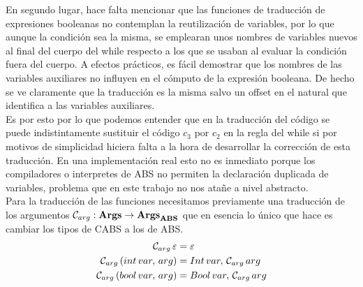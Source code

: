 En segundo lugar, hace falta mencionar que las funciones de traducción de expresiones booleanas no contemplan la reutilización de variables, por lo que aunque la condición sea la misma, se emplearan unos nombres de variables nuevos al final del cuerpo del while respecto a los que se usaban al evaluar la condición fuera del cuerpo. A efectos prácticos, es fácil demostrar que los nombres de las variables auxiliares no influyen en el cómputo de la expresión booleana. De hecho se ve claramente que la traducción es la misma salvo un offset en el natural que identifica a las variables auxiliares.\\

Es por esto por lo que podemos entender que en la traducción del código se puede indistintamente sustituir el código $c_3$ por $c_2$ en la regla del while si por motivos de simplicidad hiciera falta a la hora de desarrollar la corrección de esta traducción. En una implementación real esto no es inmediato porque los compiladores o interpretes de ABS no permiten la declaración duplicada de variables, problema que en este trabajo no nos atañe a nivel abstracto.\\

Para la traducción de las funciones necesitamos previamente una traducción de los argumentos $\mathcal{C}_{arg}: \textbf{Args} \rightarrow \textbf{Args}_{\textbf{ABS}}$ que en esencia lo único que hace es cambiar los tipos de CABS a los de ABS.
\begin{align*}
  \mathcal{C}_{arg}\,\varepsilon &= \varepsilon\\
  \mathcal{C}_{arg}\, (int \, var,\,arg) &= Int\,var,\,\mathcal{C}_{arg}\, arg\\
  \mathcal{C}_{arg}\, (bool \, var,\,arg) &= Bool\,var,\,\mathcal{C}_{arg}\, arg
\end{align*}

